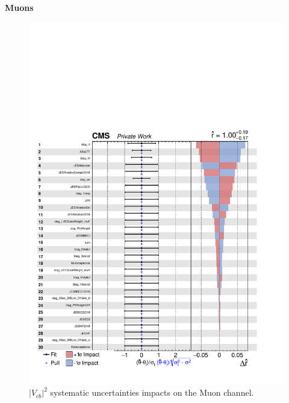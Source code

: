 \begin{center}
     {\Huge \textbf{Muons}}
\end{center}
\begin{figure}[H]
    \centering
    \includegraphics[width=\linewidth]{fig/chap09-sigback/muons_impact.pdf}
    \caption{$|V_{cb}|^2$ systematic uncertainties impacts on the Muon channel.}
    \label{fig:MuImpact}
\end{figure}


\vfill
\hspace{0pt}
\pagebreak

